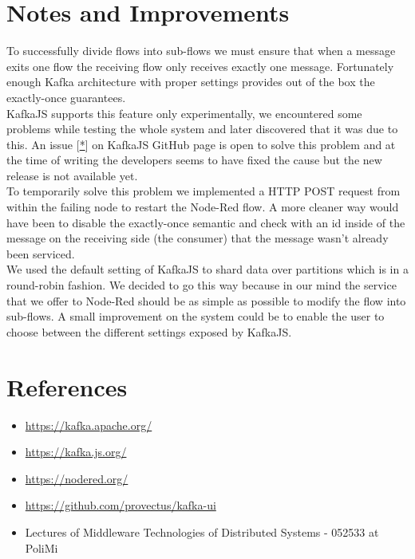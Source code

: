 \documentclass[a4paper, 12pt]{extarticle}
\begin{document}
\newpage
\section{Notes and Improvements}
To successfully divide flows into sub-flows we must ensure that when a message exits one flow the receiving flow only receives exactly one message. Fortunately enough Kafka architecture with proper settings provides out of the box the exactly-once guarantees.\\
KafkaJS supports this feature only experimentally, we encountered some problems while testing the whole system and later discovered that it was due to this. 
An issue [\href{https://github.com/tulios/kafkajs/issues/598}{*}] on KafkaJS GitHub page is open to solve this problem and at the time of writing the developers seems to have fixed the cause but the new release is not available yet. \\
To temporarily solve this problem we implemented a HTTP POST request from within the failing node to restart the Node-Red flow. A more cleaner way would have been to disable the exactly-once semantic and check with an id inside of the message on the receiving side (the consumer) that the message wasn't already been serviced. \\
We used the default setting of KafkaJS to shard data over partitions which is in a round-robin fashion. We decided to go this way because in our mind the service that we offer to Node-Red should be as simple as possible to modify the flow into sub-flows. A small improvement on the system could be to enable the user to choose between the different settings exposed by KafkaJS.  

\section{References}
\begin{itemize}
\item \url{https://kafka.apache.org/}
\item \url{https://kafka.js.org/}
\item \url{https://nodered.org/}
\item \url{https://github.com/provectus/kafka-ui}
\item Lectures of Middleware Technologies of Distributed Systems - 052533 at PoliMi
\end{itemize}
\end{document}
